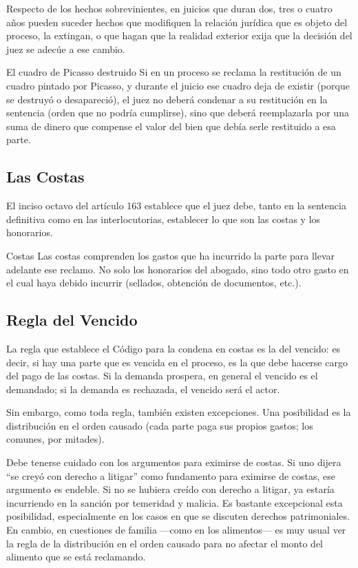 \documentclass[12pt,oneside]{book}
\begin{document}
Respecto de los hechos sobrevinientes, en juicios que duran dos, tres o cuatro años pueden suceder hechos que modifiquen la relación jurídica que es objeto del proceso, la extingan, o que hagan que la realidad exterior exija que la decisión del juez se adecúe a ese cambio.

\begin{example}{El cuadro de Picasso destruido}
Si en un proceso se reclama la restitución de un cuadro pintado por Picasso, y durante el juicio ese cuadro deja de existir (porque se destruyó o desapareció), el juez no deberá condenar a su restitución en la sentencia (orden que no podría cumplirse), sino que deberá reemplazarla por una suma de dinero que compense el valor del bien que debía serle restituido a esa parte.
\end{example}

\subsection{Las Costas}

El inciso octavo del artículo 163 establece que el juez debe, tanto en la sentencia definitiva como en las interlocutorias, establecer lo que son las costas y los honorarios.

\begin{definition}{Costas}
Las costas comprenden los gastos que ha incurrido la parte para llevar adelante ese reclamo. No solo los honorarios del abogado, sino todo otro gasto en el cual haya debido incurrir (sellados, obtención de documentos, etc.).
\end{definition}

\subsection{Regla del Vencido}

La regla que establece el Código para la condena en costas es la del vencido: es decir, si hay una parte que es vencida en el proceso, es la que debe hacerse cargo del pago de las costas. Si la demanda prospera, en general el vencido es el demandado; si la demanda es rechazada, el vencido será el actor.

Sin embargo, como toda regla, también existen excepciones. Una posibilidad es la distribución en el orden causado (cada parte paga sus propios gastos; los comunes, por mitades).

\begin{important}
Debe tenerse cuidado con los argumentos para eximirse de costas. Si uno dijera ``se creyó con derecho a litigar'' como fundamento para eximirse de costas, ese argumento es endeble. Si no se hubiera creído con derecho a litigar, ya estaría incurriendo en la sanción por temeridad y malicia. Es bastante excepcional esta posibilidad, especialmente en los casos en que se discuten derechos patrimoniales. En cambio, en cuestiones de familia —como en los alimentos— es muy usual ver la regla de la distribución en el orden causado para no afectar el monto del alimento que se está reclamando.
\end{important}
\end{document}
